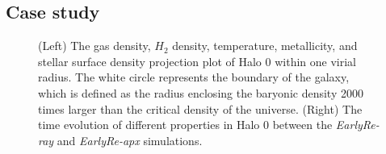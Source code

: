 \documentclass[linenumbers, twocolumn]{aastex631}
\begin{document}


\subsection{Case study}

\begin{figure}
	\caption{(Left) The gas density, $H_{2}$ density, temperature, metallicity, and stellar surface density projection plot of Halo 0 within one virial radius. The white circle represents the boundary of the galaxy, which is defined as the radius enclosing the baryonic density 2000 times larger than the critical density of the universe. (Right) The time evolution of different properties in Halo 0 between the \textit{EarlyRe-ray} and \textit{EarlyRe-apx} simulations.}
	\label{fig:Halo0-0_comparison}
\end{figure}
\end{document}
